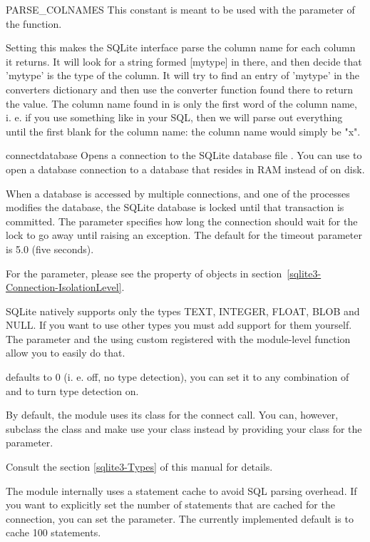 \begin{datadesc}{PARSE_COLNAMES}
This constant is meant to be used with the  parameter of the
 function.

Setting this makes the SQLite interface parse the column name for each column
it returns.  It will look for a string formed [mytype] in there, and then
decide that 'mytype' is the type of the column. It will try to find an entry of
'mytype' in the converters dictionary and then use the converter function found
there to return the value. The column name found in  is only
the first word of the column name, i.  e. if you use something like
 in your SQL, then we will parse out everything until the
first blank for the column name: the column name would simply be "x".
\end{datadesc}

\begin{funcdesc}{connect}{database}
Opens a connection to the SQLite database file . You can use
 to open a database connection to a database that resides in
RAM instead of on disk.

When a database is accessed by multiple connections, and one of the processes
modifies the database, the SQLite database is locked until that transaction is
committed. The  parameter specifies how long the connection should
wait for the lock to go away until raising an exception. The default for the
timeout parameter is 5.0 (five seconds). 

For the  parameter, please see the 
property of  objects in section~\ref{sqlite3-Connection-IsolationLevel}.

SQLite natively supports only the types TEXT, INTEGER, FLOAT, BLOB and NULL. If
you want to use other types you must add support for them yourself.
The  parameter and the using custom  registered with
the module-level  function allow you to easily do that.

 defaults to 0 (i. e. off, no type detection), you can set it
to any combination of  and  to turn type
detection on.

By default, the  module uses its  class for the
connect call.  You can, however, subclass the  class and make
 use your class instead by providing your class for the
 parameter.

Consult the section \ref{sqlite3-Types} of this manual for details.

The  module internally uses a statement cache to avoid SQL parsing
overhead. If you want to explicitly set the number of statements that are
cached for the connection, you can set the  parameter.
The currently implemented default is to cache 100 statements.
\end{funcdesc}

